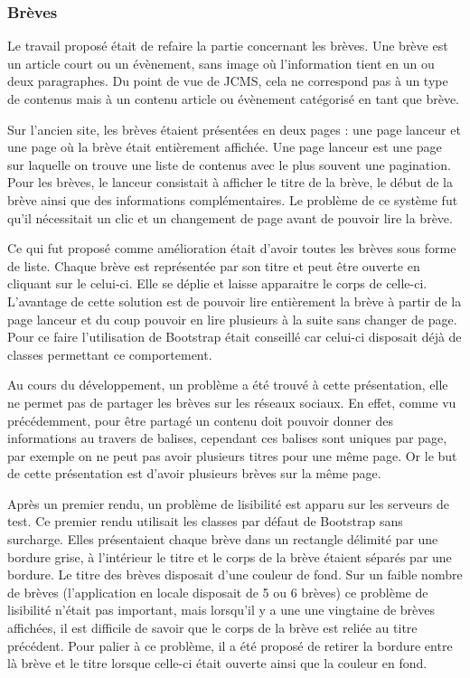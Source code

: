 \documentclass[12pt,a4paper]{article}
\begin{document}
\subsubsection{Brèves}
Le travail proposé était de refaire la partie concernant les brèves. Une brève est un article court ou un évènement, sans image où l'information tient en un ou deux paragraphes. Du point de vue de \gls{JCMS}, cela ne correspond pas à un type de contenus mais à un contenu article ou évènement catégorisé en tant que brève.\par
\medskip
Sur l'ancien site, les brèves étaient présentées en deux pages : une page lanceur et une page où la brève était entièrement affichée. Une page lanceur est une page sur laquelle on trouve une liste de contenus avec le plus souvent une pagination. Pour les brèves, le lanceur consistait à afficher le titre de la brève, le début de la brève ainsi que des informations complémentaires. Le problème de ce système fut qu'il nécessitait un clic et un changement de page avant de pouvoir lire la brève.\par
Ce qui fut proposé comme amélioration était d'avoir toutes les brèves sous forme de liste. Chaque brève est représentée par son titre et peut être ouverte en cliquant sur le celui-ci. Elle se déplie et laisse apparaitre le corps de celle-ci. L'avantage de cette solution est de pouvoir lire entièrement la brève à partir de la page lanceur et du coup pouvoir en lire plusieurs à la suite sans changer de page. Pour ce faire l'utilisation de Bootstrap était conseillé car celui-ci disposait déjà de classes permettant ce comportement.\par
\medskip
Au cours du développement, un problème a été trouvé à cette présentation, elle ne permet pas de partager les brèves sur les réseaux sociaux. En effet, comme vu précédemment, pour être partagé un contenu doit pouvoir donner des informations au travers de balises, cependant ces balises sont uniques par page, par exemple on ne peut pas avoir plusieurs titres pour une même page. Or le but de cette présentation est d'avoir plusieurs brèves sur la même page.\par
Après un premier rendu, un problème de lisibilité est apparu sur les serveurs de test. Ce premier rendu utilisait les classes par défaut de Bootstrap sans surcharge. Elles présentaient chaque brève dans un rectangle délimité par une bordure grise, à l'intérieur le titre et le corps de la brève étaient séparés par une bordure. Le titre des brèves disposait d'une couleur de fond. Sur un faible nombre de brèves (l'application en locale disposait de 5 ou 6 brèves) ce problème de lisibilité n'était pas important, mais lorsqu'il y a une une vingtaine de brèves affichées, il est difficile de savoir que le corps de la brève est reliée au titre précédent. Pour palier à ce problème, il a été proposé de retirer la bordure entre là brève et le titre lorsque celle-ci était ouverte ainsi que la couleur en fond.\par
\end{document}
